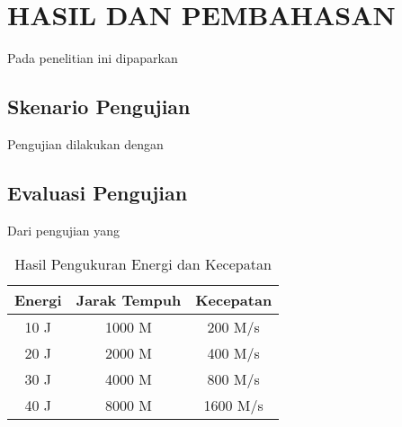 \chapter{HASIL DAN PEMBAHASAN}
\label{chap:hasilpembahasan}


Pada penelitian ini dipaparkan \lipsum[1][1-5]


\section{Skenario Pengujian}
\label{sec:skenariopengujian}

Pengujian dilakukan dengan \lipsum[1-2]

\section{Evaluasi Pengujian}
\label{sec:analisispengujian}

Dari pengujian yang \lipsum[1]

\begin{longtable}{|c|c|c|}
  \caption{Hasil Pengukuran Energi dan Kecepatan}
  \label{tb:EnergiKecepatan}\\
  \hline
  \rowcolor[HTML]{C0C0C0}
  \textbf{Energi} & \textbf{Jarak Tempuh} & \textbf{Kecepatan} \\
  \hline
  10 J & 1000 M & 200 M/s \\
  20 J & 2000 M & 400 M/s \\
  30 J & 4000 M & 800 M/s \\
  40 J & 8000 M & 1600 M/s \\
  \hline
\end{longtable}

\lipsum[2-4]
